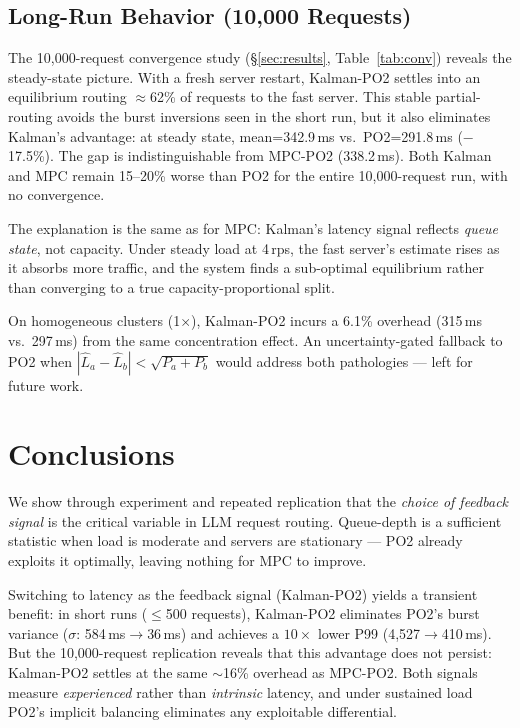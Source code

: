 \documentclass[blind]{gtac}
\begin{document}
\subsection{Long-Run Behavior (10,000 Requests)}

The 10,000-request convergence study (\S\ref{sec:results}, Table~\ref{tab:conv})
reveals the steady-state picture. With a fresh server restart,
Kalman-PO2 settles into an equilibrium routing $\approx$62\% of
requests to the fast server. This stable partial-routing avoids the
burst inversions seen in the short run, but it also eliminates
Kalman's advantage: at steady state, mean=342.9\,ms vs.\
PO2=291.8\,ms ($-$17.5\%). The gap is indistinguishable from MPC-PO2
(338.2\,ms). Both Kalman and MPC remain 15--20\% worse than PO2 for
the entire 10,000-request run, with no convergence.

The explanation is the same as for MPC: Kalman's latency signal reflects
\emph{queue state}, not capacity. Under steady load at 4\,rps,
the fast server's estimate rises as it absorbs more traffic, and
the system finds a sub-optimal equilibrium rather than converging
to a true capacity-proportional split.

On homogeneous clusters (1$\times$), Kalman-PO2 incurs a 6.1\%
overhead (315\,ms vs.\ 297\,ms) from the same concentration effect.
An uncertainty-gated fallback to PO2 when
$|\hat{L}_a - \hat{L}_b| < \sqrt{P_a + P_b}$ would address both
pathologies --- left for future work.

\section{Conclusions}
\label{sec:conclusions}

We show through experiment and repeated replication that the
\emph{choice of feedback signal} is the critical variable in LLM
request routing. Queue-depth is a sufficient statistic when load is
moderate and servers are stationary --- PO2 already exploits it
optimally, leaving nothing for MPC to improve.

Switching to latency as the feedback signal (Kalman-PO2) yields a
transient benefit: in short runs ($\leq$500 requests), Kalman-PO2
eliminates PO2's burst variance ($\sigma$: 584\,ms$\to$36\,ms) and
achieves a $10\times$ lower P99 (4,527$\to$410\,ms). But the
10,000-request replication reveals that this advantage does not
persist: Kalman-PO2 settles at the same $\sim$16\% overhead as MPC-PO2.
Both signals measure \emph{experienced} rather than \emph{intrinsic}
latency, and under sustained load PO2's implicit balancing eliminates
any exploitable differential.
\end{document}
